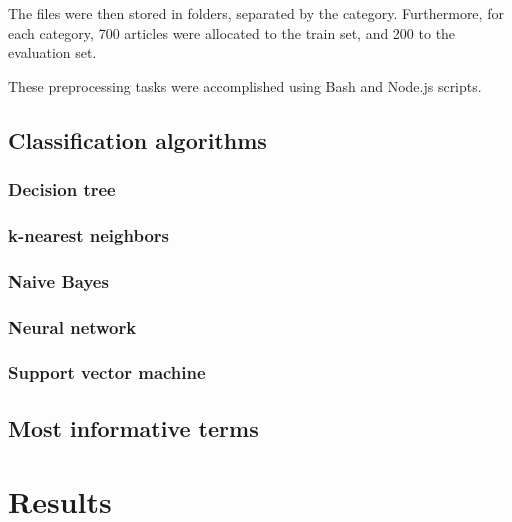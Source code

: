 \documentclass[conference]{IEEEtran}
\begin{document}
The files were then stored in folders, separated by the category.
Furthermore, for each category, 700 articles were allocated to the
train set, and 200 to the evaluation set.

These preprocessing tasks were accomplished using Bash and Node.js
scripts.

\subsection{Classification algorithms}


\subsubsection{Decision tree}
\subsubsection{k-nearest neighbors}
\subsubsection{Naive Bayes}
\subsubsection{Neural network}
\subsubsection{Support vector machine}

\subsection{Most informative terms}

\section{Results}
\end{document}
